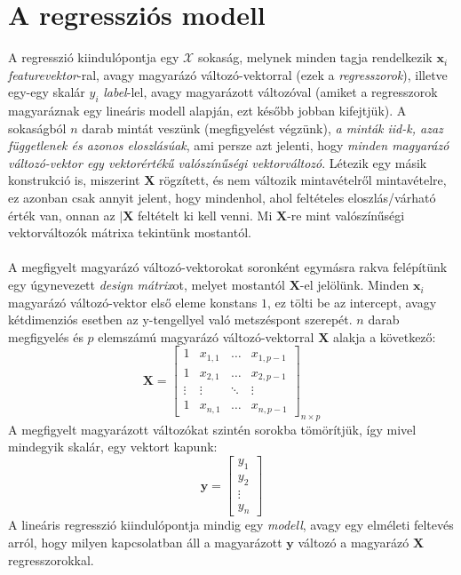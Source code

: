 \documentclass[14p]{report}
\def\pmb{\boldsymbol}
\newcounter{x}
\newcounter{y}
\newcounter{z}
\begin{document}
	\section{A regressziós modell}
	A regresszió kiindulópontja egy $\mathscr{X}$ sokaság, melynek minden tagja rendelkezik $\pmb{x}_i$ \emph{featurevektor}-ral, avagy magyarázó változó-vektorral (ezek a \emph{regresszorok}), illetve egy-egy skalár $y_i$ \emph{label}-lel, avagy magyarázott változóval (amiket a regresszorok magyaráznak egy lineáris modell alapján, ezt később jobban kifejtjük). A sokaságból $n$ darab mintát veszünk (megfigyelést végzünk), \emph{a minták iid-k, azaz függetlenek és azonos eloszlásúak}, ami persze azt jelenti, hogy \emph{minden magyarázó változó-vektor egy vektorértékű valószínűségi vektorváltozó}. Létezik egy másik konstrukció is, miszerint $\pmb{X}$ rögzített, és nem változik mintavételről mintavételre, ez azonban csak annyit jelent, hogy mindenhol, ahol feltételes eloszlás/várható érték van, onnan az $\mid \pmb{X}$ feltételt ki kell venni. Mi $\pmb{X}$-re mint valószínűségi vektorváltozók mátrixa tekintünk mostantól.
	\\
	\\
	A megfigyelt magyarázó változó-vektorokat soronként egymásra rakva felépítünk egy úgynevezett \emph{design mátrix}ot, melyet mostantól $\pmb{X}$-el jelölünk. Minden $\pmb{x}_i$ magyarázó változó-vektor első eleme konstans $1$, ez tölti be az intercept, avagy kétdimenziós esetben az y-tengellyel való metszéspont szerepét. $n$ darab megfigyelés és $p$ elemszámú magyarázó változó-vektorral $\pmb{X}$ alakja a következő:
	\[
	\pmb{X} = 
	\begin{bmatrix}
		1 & x_{1,1} & \dots & x_{1,p-1} \\
		1 & x_{2,1} & \dots & x_{2,p-1} \\
		\vdots & \vdots & \ddots & \vdots \\
		1 & x_{n,1} & \dots & x_{n,p-1}	
	\end{bmatrix}_{n \times p}
	\]
	A megfigyelt magyarázott változókat szintén sorokba tömörítjük, így mivel mindegyik skalár, egy vektort kapunk:
	\[
	\pmb{y} =
	\begin{bmatrix}
		y_1 \\
		y_2 \\
		\vdots \\
		y_n
	\end{bmatrix}
	\]
	A lineáris regresszió kiindulópontja mindig egy \emph{modell}, avagy egy elméleti feltevés arról, hogy milyen kapcsolatban áll a magyarázott $\pmb{y}$ változó a magyarázó $\pmb{X}$ regresszorokkal.
\end{document}
